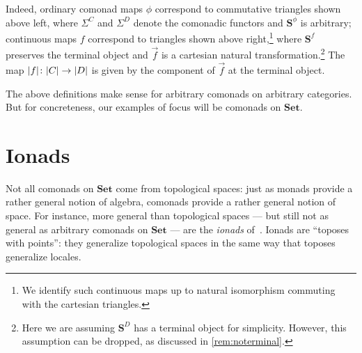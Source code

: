 \documentclass[11pt, oneside, article]{memoir}
\theoremstyle{plain}
\theoremstyle{definition}
\theoremstyle{remark}
\DeclarePairedDelimiter{\abs}{\lvert}{\rvert}
\newcommand{\namedcat}[1]{\mathbf{#1}}
\newcommand{\cat}[1]{\mathbf{#1}}
\newcommand{\Set}{\namedcat{Set}}
\newcommand{\CoalgOn}[2]{{#2}^{#1}}
\newcommand{\CoalgS}[1]{\CoalgOn{#1}{\bS}}
\newcommand{\pts}[1]{{\abs{#1}}}
\newcommand{\one}[1]{\pts{#1}}
\newcommand{\carr}{\Sigma}
\newcommand{\car}[1]{\carr^{#1}}
\newcommand{\carC}{\car{\cC}}
\newcommand{\carD}{\car{\cD}}
\newcommand{\com}[2]{{#1}^{#2}}
\newcommand{\con}[2]{{#1}^{#2}}
\newcommand{\connat}[1]{\vec{#1}}
\newcommand{\cmnd}[1]{{#1}}
\newcommand{\cC}{\cmnd{C}}
\newcommand{\cD}{\cmnd{D}}
\newcommand{\bS}{\cat{S}}
\newcommand{\DS}{\CoalgS{\cD}}
\begin{document}
Indeed, ordinary comonad maps $\phi$ correspond to commutative
triangles shown above left, where $\carC$ and $\carD$ denote the
comonadic functors and $\com{\bS}{\phi}$ is arbitrary; continuous maps
$f$ correspond to triangles shown above right,\footnote{We identify
  such continuous maps up to natural isomorphism commuting with the
  cartesian triangles.} where $\con{\bS}{f}$ preserves the terminal
object and $\connat{f}$ is a cartesian natural
transformation.\footnote{Here we are assuming $\DS$ has a terminal
  object for simplicity. However, this assumption can be dropped, as
  discussed in \cref{rem:noterminal}.} The map
$\one{f} \colon \pts{\cC} \to \pts{\cD}$ is given by the component of
$\connat{f}$ at the terminal object.


The above definitions make sense for arbitrary comonads on arbitrary
categories. But for concreteness, our examples of focus will be
comonads on $\Set$.

\section*{Ionads}

Not all comonads on $\Set$ come from topological spaces: just as
monads provide a rather general notion of algebra, comonads provide a
rather general notion of space. For instance, more general than
topological spaces --- but still not as general as arbitrary comonads
on $\Set$ --- are the \emph{ionads} of~\cite{garner:ionads}. Ionads
are ``toposes with points'': they generalize topological spaces in the
same way that toposes generalize locales.
\end{document}
